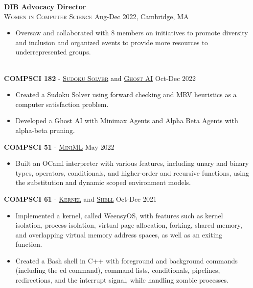 \documentclass[11pt]{article}
\begin{document}
  \noindent\textbf{DIB Advocacy Director} \\
  \textsc{Women in Computer Science} \hfill Aug-Dec 2022, Cambridge, MA
  \begin{itemize}[itemsep=-.4em, leftmargin=1em]\vspace{-2mm}
    \item Oversaw and collaborated with 8 members on initiatives to promote diversity and inclusion and organized events to provide more resources to underrepresented groups.
  \end{itemize}

  \vspace{-7pt}\\
  \noindent\makebox[\linewidth]{\rule{7.5in}{0.3pt}}
    \noindent \textbf{COMPSCI 182} - \href{http://procaccia.info/courses/CS182-F22/pset2.pdf}{\textsc{Sudoku Solver}} and \href{http://procaccia.info/courses/CS182-F22/pset3.pdf}{\textsc{Ghost AI}} \hfill Oct-Dec 2022
    \begin{itemize}[itemsep=-.4em, leftmargin=1em]\vspace{-2mm}
      \item Created a Sudoku Solver using forward checking and MRV heuristics as a computer satisfaction problem.
      \item Developed a Ghost AI with Minimax Agents and Alpha Beta Agents with alpha-beta pruning. 
    \end{itemize}\vspace{-1mm}
    \noindent \textbf{COMPSCI 51} - \href{https://book.cs51.io/pdfs/abstraction-21-project.pdf}{\textsc{MiniML}} \hfill May 2022
    \begin{itemize}[itemsep=-.4em, leftmargin=1em]\vspace{-2mm}
      \item Built an OCaml interpreter with various features, including unary and binary types, operators, conditionals, and higher-order and recursive functions, using the substitution and dynamic scoped environment models. 
    \end{itemize}\vspace{-1mm}
    \noindent \textbf{COMPSCI 61} - 
      \href{https://cs61.seas.harvard.edu/site/2021/WeensyOS/}{\textsc{Kernel}} and 
      \href{https://cs61.seas.harvard.edu/site/2021/Shell/}{\textsc{Shell}} \hfill Oct-Dec 2021
    \begin{itemize}[itemsep=-.4em, leftmargin=1em]\vspace{-2mm}
      \item Implemented a kernel, called WeensyOS, with features such as kernel isolation, process isolation, virtual page allocation, forking, shared memory, and overlapping virtual memory address spaces, as well as an exiting function.
      \item Created a Bash shell in C++ with foreground and background commands (including the cd command), command lists, conditionals, pipelines, redirections, and the interrupt signal, while handling zombie processes.
    \end{itemize}
  
\end{document}
